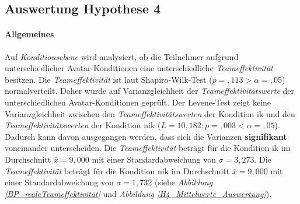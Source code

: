 \documentclass[a4paper,11pt]{article}%
\renewcommand{\\}{\vspace*{0.5\baselineskip} \newline}
\begin{document}
{{{{{{{{{\newpage
\subsection{Auswertung Hypothese 4}
\label{Auswertung Hypothese 4}

\paragraph{Allgemeines}
Auf \textit{Konditionsebene} wird analysiert, ob die Teilnehmer aufgrund unterschiedlicher Avatar-Konditionen eine unterschiedliche \textit{Teameffektivität} besitzen.\\
Die \textit{Teameffektivität} ist laut Shapiro-Wilk-Test ($p =,113 > \alpha = ,05$) normalverteilt. Daher wurde auf Varianzgleichheit der \textit{Teameffektivitätswerte} der unterschiedlichen Avatar-Konditionen geprüft. Der Levene-Test zeigt keine Varianzgleichheit zwischen den \textit{Teameffektivitätswerten} der Kondition \ac{ik} und den \textit{Teameffektivitätswerten} der Kondition \ac{nik} ($L = 10,182; p=,003 < \alpha = ,05$). Dadurch kann davon ausgegangen werden, dass sich die Varianzen \textbf{signifikant} voneinander unterscheiden. \\
Die \textit{Teameffektivität} beträgt für die Kondition \ac{ik} im Durchschnitt $\bar{x} = 9,000$ mit einer Standardabweichung von $\sigma = 3,273$.\newline 
Die \textit{Teameffektivität} beträgt für die Kondition \ac{nik} im Durchschnitt $\bar{x} = 9,000$ mit einer Standardabweichung von $\sigma = 1,732$ (siehe \textit{Abbildung \ref{BP_realeTeameffektivität}} und \textit{Abbildung \ref{H4_Mittelwerte_Auswertung}}).


}}}}}}}}}
\end{document}
